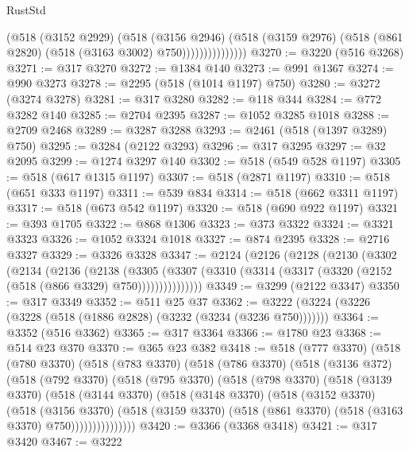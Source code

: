 \begin{lexlean}{RustStd}
\begin{coremodule}
                        (@518
                          (@3152 @2929)
                          (@518
                            (@3156 @2946)
                            (@518
                              (@3159 @2976)
                              (@518 (@861 @2820) (@518 (@3163 @3002) @750)))))))))))))))
@3270 := @3220 (@516 @3268)
@3271 := @317 @3270
@3272 := @1384 @140
@3273 := @991 @1367
@3274 := @990 @3273
@3278 := @2295 (@518 (@1014 @1197) @750)
@3280 := @3272 (@3274 @3278)
@3281 := @317 @3280
@3282 := @118 @344
@3284 := @772 @3282 @140
@3285 := @2704 @2395
@3287 := @1052 @3285 @1018
@3288 := @2709 @2468
@3289 := @3287 @3288
@3293 := @2461 (@518 (@1397 @3289) @750)
@3295 := @3284 (@2122 @3293)
@3296 := @317 @3295
@3297 := @32 @2095
@3299 := @1274 @3297 @140
@3302 := @518 (@549 @528 @1197)
@3305 := @518 (@617 @1315 @1197)
@3307 := @518 (@2871 @1197)
@3310 := @518 (@651 @333 @1197)
@3311 := @539 @834
@3314 := @518 (@662 @3311 @1197)
@3317 := @518 (@673 @542 @1197)
@3320 := @518 (@690 @922 @1197)
@3321 := @393 @1705
@3322 := @868 @1306
@3323 := @373 @3322
@3324 := @3321 @3323
@3326 := @1052 @3324 @1018
@3327 := @874 @2395
@3328 := @2716 @3327
@3329 := @3326 @3328
@3347 := @2124
    (@2126
      (@2128
        (@2130
          (@3302
            (@2134
              (@2136
                (@2138
                  (@3305
                    (@3307 (@3310 (@3314 (@3317 (@3320 (@2152 (@518 (@866 @3329) @750)))))))))))))))
@3349 := @3299 (@2122 @3347)
@3350 := @317 @3349
@3352 := @511 @25 @37
@3362 := @3222 (@3224 (@3226 (@3228 (@518 (@1886 @2828) (@3232 (@3234 (@3236 @750)))))))
@3364 := @3352 (@516 @3362)
@3365 := @317 @3364
@3366 := @1780 @23
@3368 := @514 @23 @370
@3370 := @365 @23 @382
@3418 := @518
    (@777 @3370)
    (@518
      (@780 @3370)
      (@518
        (@783 @3370)
        (@518
          (@786 @3370)
          (@518
            (@3136 @372)
            (@518
              (@792 @3370)
              (@518
                (@795 @3370)
                (@518
                  (@798 @3370)
                  (@518
                    (@3139 @3370)
                    (@518
                      (@3144 @3370)
                      (@518
                        (@3148 @3370)
                        (@518
                          (@3152 @3370)
                          (@518
                            (@3156 @3370)
                            (@518
                              (@3159 @3370)
                              (@518 (@861 @3370) (@518 (@3163 @3370) @750)))))))))))))))
@3420 := @3366 (@3368 @3418)
@3421 := @317 @3420
@3467 := @3222

\end{coremodule}
\end{lexlean}
